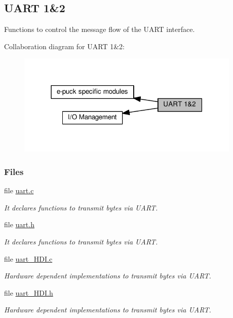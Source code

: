 \hypertarget{group__uart}{}\subsection{U\+A\+R\+T 1\&2}
\label{group__uart}


Functions to control the message flow of the U\+A\+R\+T interface.  


Collaboration diagram for U\+A\+R\+T 1\&2\+:\nopagebreak
\begin{figure}[H]
\begin{center}
\leavevmode
\includegraphics[width=303pt]{db/def/group__uart}
\end{center}
\end{figure}
\subsubsection*{Files}
\begin{DoxyCompactItemize}
\item 
file \hyperlink{uart_8c}{uart.\+c}
\begin{DoxyCompactList}\small\item\em It declares functions to transmit bytes via U\+A\+R\+T. \end{DoxyCompactList}\item 
file \hyperlink{uart_8h}{uart.\+h}
\begin{DoxyCompactList}\small\item\em It declares functions to transmit bytes via U\+A\+R\+T. \end{DoxyCompactList}\item 
file \hyperlink{uart__HDI_8c}{uart\+\_\+\+H\+D\+I.\+c}
\begin{DoxyCompactList}\small\item\em Hardware dependent implementations to transmit bytes via U\+A\+R\+T. \end{DoxyCompactList}\item 
file \hyperlink{uart__HDI_8h}{uart\+\_\+\+H\+D\+I.\+h}
\begin{DoxyCompactList}\small\item\em Hardware dependent implementations to transmit bytes via U\+A\+R\+T. \end{DoxyCompactList}\end{DoxyCompactItemize}


